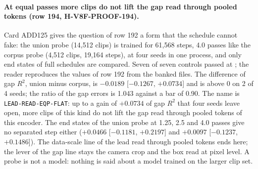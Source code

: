 \paragraph{At equal passes more clips do not lift the gap read through pooled tokens (row 194, H-V8F-PROOF-194).} Card ADD125 gives the question of row 192 a form that the schedule cannot fake: the union probe (14,512 clips) is trained for 61,568 steps, 4.0 passes like the corpus probe (4,512 clips, 19,164 steps), at four seeds in one process, and only end states of full schedules are compared. Seven of seven controls passed at ; the reader reproduces the values of row 192 from the banked files. The difference of gap $R^2$, union minus corpus, is $-0.0189$ [$-0.1267$, $+0.0734$] and is above 0 on 2 of 4 seeds; the ratio of the gap errors is 1.043 against a bar of 0.90. The name is \texttt{LEAD-READ-EQP-FLAT}: up to a gain of $+0.0734$ of gap $R^2$ that four seeds leave open, more clips of this kind do not lift the gap read through pooled tokens of this encoder. The end states of the union probe at 1.25, 2.5 and 4.0 passes give no separated step either ($+0.0466$ [$-0.1181$, $+0.2197$] and $+0.0097$ [$-0.1237$, $+0.1486$]). The data-scale line of the lead read through pooled tokens ends here; the lever of the gap line stays the camera crop and the box read at pixel level. A probe is not a model: nothing is said about a model trained on the larger clip set.
